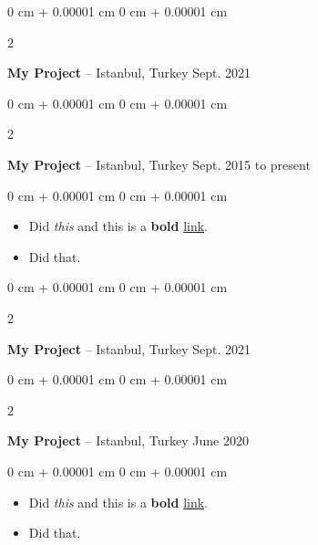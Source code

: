 \documentclass[10pt, letterpaper]{article}
\newenvironment{highlights}{
    \begin{itemize}[
        topsep=0.10 cm,
        parsep=0.10 cm,
        partopsep=0pt,
        itemsep=0pt,
        leftmargin=0 cm + 10pt
    ]
}{
    \end{itemize}
        
    \vspace{-0.10cm}
} %
\newenvironment{onecolentry}{
    \begin{adjustwidth}{
        0 cm + 0.00001 cm
    }{
        0 cm + 0.00001 cm
    }
}{
    \end{adjustwidth}
} %
\newenvironment{twocolentry}[2][]{
    \onecolentry
    \def\secondColumn{#2}
    \setcolumnwidth{\fill, 4.1 cm}
    \begin{paracol}{2}
}{
    \switchcolumn \raggedleft \secondColumn
    \end{paracol}
    \endonecolentry
} %
\begin{document}
        \vspace{0.10 cm}


        \vspace{0.15 cm}

        \begin{twocolentry}{
            Sept. 2021
        }
            \textbf{My Project} -- Istanbul, Turkey\end{twocolentry}

        \vspace{0.10 cm}


        \vspace{0.15 cm}

        \begin{twocolentry}{
            Sept. 2015 to present
        }
            \textbf{My Project} -- Istanbul, Turkey\end{twocolentry}

        \vspace{0.10 cm}
        \begin{onecolentry}
            \begin{highlights}
                \item Did \textit{this} and this is a \textbf{bold} \href{https://example.com}{link}.
                \item Did that.
            \end{highlights}
        \end{onecolentry}


        \vspace{0.15 cm}

        \begin{twocolentry}{
            Sept. 2021
        }
            \textbf{My Project} -- Istanbul, Turkey\end{twocolentry}

        \vspace{0.10 cm}


        \vspace{0.15 cm}

        \begin{twocolentry}{
            June 2020
        }
            \textbf{My Project} -- Istanbul, Turkey\end{twocolentry}

        \vspace{0.10 cm}
        \begin{onecolentry}
            \begin{highlights}
                \item Did \textit{this} and this is a \textbf{bold} \href{https://example.com}{link}.
                \item Did that.
            \end{highlights}
        \end{onecolentry}
\end{document}
